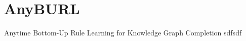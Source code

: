 \section{AnyBURL}

Anytime Bottom-Up Rule Learning for Knowledge Graph Completion \cite{meilicke2019anytime}
sdfsdf